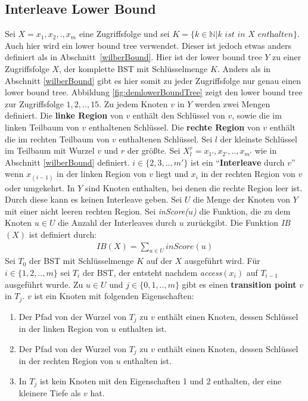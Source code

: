 \documentclass[a4paper,12pt]{article}
\begin{document}
\subsection{Interleave Lower Bound} \label{interBound}
Sei $X = x_1,x_2,.,x_m$ eine Zugriffsfolge und sei $K = \{k \in \mathbb{N} \vert k \textit{ ist in $X$ enthalten}\}$. Auch hier wird ein lower bound tree verwendet. Dieser ist jedoch etwas anders definiert als in \mbox{Abschnitt \ref{wilberBound}}. Hier ist der lower bound tree $Y$ zu einer Zugriffsfolge $X$, der komplette BST mit Schlüsselmenge $K$. Anders als in Abschnitt \ref{wilberBound}  gibt es hier somit zu jeder Zugriffsfolge nur genau einen lower bound tree. Abbildung \ref{fig:demlowerBoundTree} zeigt den lower bound tree zur Zugriffsfolge $1, 2,.., 15$. Zu jedem Knoten $v$ in $Y$ werden zwei Mengen definiert. Die \textbf{linke Region} von $v$ enthält den Schlüssel von $v$, sowie die im linken Teilbaum von $v$ enthaltenen Schlüssel.  Die \textbf{rechte Region} von $v$ enthält die im rechten Teilbaum von $v$ enthaltenen Schlüssel. Sei $l$ der kleinste Schlüssel im Teilbaum mit Wurzel $v$ und $r$ der größte. Sei  $X^r_l = {x_{1'},x_{2'},..,x_{m'}}$ wie in Abschnitt \ref{wilberBound} definiert. $i \in \{2,3,..,m'\}$ ist ein \enquote{\textbf{Interleave} durch $v$} wenn $x_{\left(i -1\right)}$ in der linken Region von $v$ liegt und $x_i$ in der rechten Region von $v$ oder umgekehrt. In $Y$ sind Knoten enthalten, bei denen die rechte Region leer ist. Durch diese kann es keinen Interleave geben. Sei $U$ die Menge der Knoten von $Y$ mit einer nicht leeren rechten Region. Sei \textit{inScore($u$)} die Funktion, die zu dem Knoten $u \in U$ die Anzahl der Interleaves durch $u$ zurückgibt.  Die Funktion \textit{IB$\left(X\right)$} ist definiert durch:
\begin{align*}
\mathit{IB}\left(X\right) = \sum_{u \in U} \mathit{inScore}\left(u\right)
\end{align*}
Sei $T_0$ der BST mit Schlüsselmenge $K$ auf der $X$ ausgeführt wird. Für $i \in \{1,2,..,m\}$ sei $T_i$ der BST, der entsteht nachdem \textit{access}$\left(x_i\right)$ auf $T_{i-1}$ ausgeführt wurde. Zu $u \in U$ und  $j \in \{0,1,..,m\}$ gibt es einen \textbf{transition point} $v$ in $T_j$. $v$ ist ein Knoten mit folgenden Eigenschaften:\\
\begin{enumerate}
	\item Der Pfad von der Wurzel von $T_j$ zu $v$ enthält einen Knoten, dessen Schlüssel in der linken Region von $u$ enthalten ist.
	\item Der Pfad von der Wurzel von $T_j$ zu $v$ enthält einen Knoten, dessen Schlüssel in der rechten Region von $u$ enthalten ist.
	\item In $T_j$ ist kein Knoten mit den Eigenschaften 1 und 2 enthalten, der eine kleinere Tiefe als $v$ hat. 
\end{enumerate}
\end{document}
